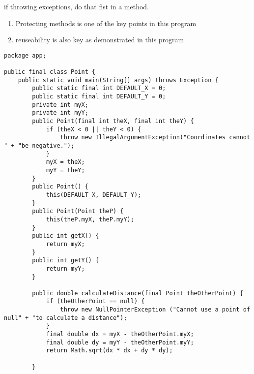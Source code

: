\documentclass{article}
\begin{document}
if throwing exceptions, do that fist in a method.\\

\begin{enumerate}
\item Protecting methods is one of the key points in this program
\item reuseability is also key as demonstrated in this program
\end{enumerate}




\begin{lstlisting}
package app;

public final class Point {
    public static void main(String[] args) throws Exception {
        public static final int DEFAULT_X = 0;
        public static final int DEFAULT_Y = 0;
        private int myX;
        private int myY;
        public Point(final int theX, final int theY) {
            if (theX < 0 || theY < 0) {
                throw new IllegalArgumentException("Coordinates cannot " + "be negative.");
            }
            myX = theX;
            myY = theY;
        }
        public Point() {
            this(DEFAULT_X, DEFAULT_Y);
        }
        public Point(Point theP) {
            this(theP.myX, theP.myY);
        }
        public int getX() {
            return myX;
        }
        public int getY() {
            return myY;
        }
    
        public double calculateDistance(final Point theOtherPoint) {
            if (theOtherPoint == null) {
                throw new NullPointerException ("Cannot use a point of null" + "to calculate a distance");
            }
            final double dx = myX - theOtherPoint.myX;
            final double dy = myY - theOtherPoint.myY;
            return Math.sqrt(dx * dx + dy * dy);
    
        }


\end{lstlisting}
\end{document}
